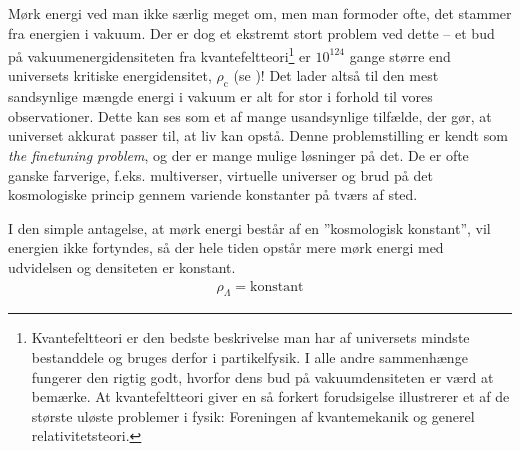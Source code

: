 Mørk energi ved man ikke særlig meget om, men man formoder ofte, det stammer fra energien i vakuum. Der er dog et ekstremt stort problem ved dette -- et bud på vakuumenergidensiteten fra kvantefeltteori\footnote{Kvantefeltteori er den bedste beskrivelse man har af universets mindste bestanddele og bruges derfor i partikelfysik. I alle andre sammenhænge fungerer den rigtig godt, hvorfor dens bud på vakuumdensiteten er værd at bemærke. At kvantefeltteori giver en så forkert forudsigelse illustrerer et af de største uløste problemer i fysik: Foreningen af kvantemekanik og generel relativitetsteori.} er $10^{124}$ gange større end universets kritiske energidensitet, $\rho_\text{c}$ (se %
\cite{rydenIntroductionCosmology2006})!  Det lader altså til den mest sandsynlige mængde energi i vakuum er alt for stor i forhold til vores observationer. Dette kan ses som et af mange usandsynlige tilfælde, der gør, at universet akkurat passer til, at liv kan opstå. Denne problemstilling er kendt som \emph{the finetuning problem}, og der er mange mulige løsninger på det. De er ofte ganske farverige, f.eks. multiverser, virtuelle universer og brud på det kosmologiske princip gennem variende konstanter på tværs af sted. %

I den simple antagelse, at mørk energi består af en ''kosmologisk konstant'', vil energien ikke fortyndes, så der hele tiden opstår mere mørk energi med udvidelsen og densiteten er konstant.
\begin{align}
\rho_\Lambda = \text{konstant}
\end{align}

